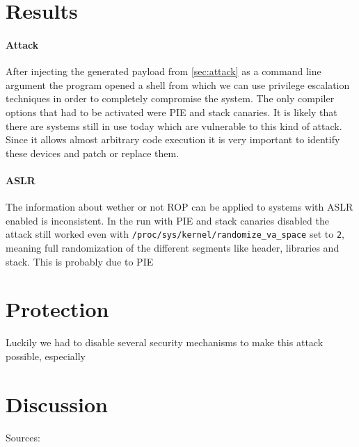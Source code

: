 \documentclass[journal=tosc,submission, notanonymous]{iacrtrans}
\begin{document}
\section{Results}
\paragraph{Attack}
After injecting the generated payload from \cref{sec:attack} as a command line argument the program opened a shell from which we can use privilege escalation techniques in order to completely compromise the system. The only compiler options that had to be activated were PIE and stack canaries. It is likely that there are systems still in use today which are vulnerable to this kind of attack. Since it allows almost arbitrary code execution it is very important to identify these devices and patch or replace them.
\paragraph{ASLR}
The information about wether or not ROP can be applied to systems with ASLR enabled is inconsistent. In the run with PIE and stack canaries disabled the attack still worked even with \Verb+/proc/sys/kernel/randomize_va_space+ set to \Verb+2+, meaning full randomization of the different segments like header, libraries and stack. This is probably due to PIE

\section{Protection}
Luckily we had to disable several security mechanisms to make this attack possible, especially 

\section{Discussion}
Sources:



\end{document}
